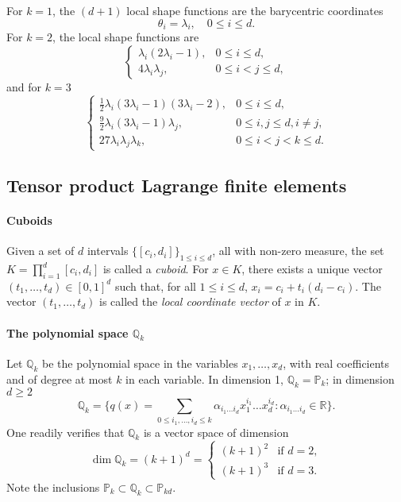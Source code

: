 For $k=1$, the $(d+1)$ local shape functions are the barycentric coordinates
\begin{equation}
    \theta_i = \lambda_i, \quad 0 \le i \le d.
\end{equation}
For $k=2$, the local shape functions are
\begin{equation}
    \begin{cases} \lambda_i(2\lambda_i - 1), & 0 \le i \le d, \\ 4\lambda_i \lambda_j, & 0 \le i < j \le d, \end{cases}
\end{equation}
and for $k=3$
\begin{equation}
    \begin{cases} \frac{1}{2}\lambda_i(3\lambda_i - 1)(3\lambda_i - 2), & 0 \le i \le d, \\ \frac{9}{2}\lambda_i(3\lambda_i - 1)\lambda_j, & 0 \le i,j \le d, i \ne j, \\ 27\lambda_i \lambda_j \lambda_k, & 0 \le i < j < k \le d. \end{cases}
\end{equation}
\subsection{Tensor product Lagrange finite elements}
\paragraph{Cuboids} Given a set of $d$ intervals $\{[c_i, d_i]\}_{1 \le i \le d}$, all with non-zero measure, the set $K = \prod_{i=1}^d [c_i, d_i]$ is called a \emph{cuboid}. For $x \in K$, there exists a unique vector $(t_1, \dots, t_d) \in [0, 1]^d$ such that, for all $1 \le i \le d$, $x_i = c_i + t_i(d_i - c_i)$. The vector $(t_1, \dots, t_d)$ is called the \emph{local coordinate vector} of $x$ in $K$.

\paragraph{The polynomial space $\mathbb{Q}_k$} Let $\mathbb{Q}_k$ be the polynomial space in the variables $x_1, \dots, x_d$, with real coefficients and of degree at most $k$ in each variable. In dimension 1, $\mathbb{Q}_k = \mathbb{P}_k$; in dimension $d \ge 2$
\begin{equation}
    \mathbb{Q}_k = \{ q(x) = \sum_{0 \le i_1, \dots, i_d \le k} \alpha_{i_1 \dots i_d} x_1^{i_1} \dots x_d^{i_d} : \alpha_{i_1 \dots i_d} \in \mathbb{R} \}.
\end{equation}
One readily verifies that $\mathbb{Q}_k$ is a vector space of dimension
\begin{equation}
    \dim \mathbb{Q}_k = (k+1)^d = \begin{cases} (k+1)^2 & \text{if } d=2, \\ (k+1)^3 & \text{if } d=3. \end{cases}
\end{equation}
Note the inclusions $\mathbb{P}_k \subset \mathbb{Q}_k \subset \mathbb{P}_{kd}$.

